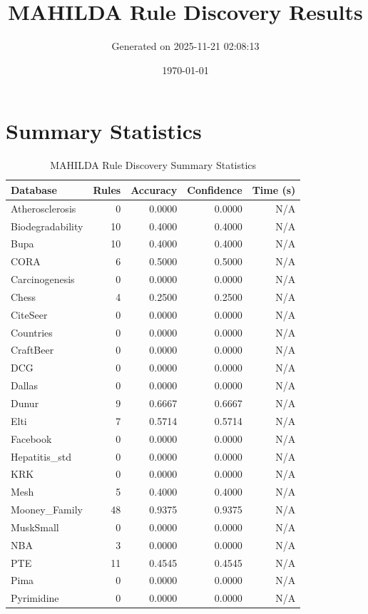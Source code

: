 \documentclass[11pt,a4paper]{article}
\title{MAHILDA Rule Discovery Results}
\author{Generated on 2025-11-21 02:08:13}
\date{\today}
\begin{document}
\maketitle

\section{Summary Statistics}
\begin{table}[h!]
\centering
\caption{MAHILDA Rule Discovery Summary Statistics}
\label{tab:mahilda_summary}
\begin{tabular}{|l|r|r|r|r|}
\hline
\textbf{Database} & \textbf{Rules} & \textbf{Accuracy} & \textbf{Confidence} & \textbf{Time (s)} \\
\hline
Atherosclerosis & 0 & 0.0000 & 0.0000 & N/A \\
Biodegradability & 10 & 0.4000 & 0.4000 & N/A \\
Bupa & 10 & 0.4000 & 0.4000 & N/A \\
CORA & 6 & 0.5000 & 0.5000 & N/A \\
Carcinogenesis & 0 & 0.0000 & 0.0000 & N/A \\
Chess & 4 & 0.2500 & 0.2500 & N/A \\
CiteSeer & 0 & 0.0000 & 0.0000 & N/A \\
Countries & 0 & 0.0000 & 0.0000 & N/A \\
CraftBeer & 0 & 0.0000 & 0.0000 & N/A \\
DCG & 0 & 0.0000 & 0.0000 & N/A \\
Dallas & 0 & 0.0000 & 0.0000 & N/A \\
Dunur & 9 & 0.6667 & 0.6667 & N/A \\
Elti & 7 & 0.5714 & 0.5714 & N/A \\
Facebook & 0 & 0.0000 & 0.0000 & N/A \\
Hepatitis_std & 0 & 0.0000 & 0.0000 & N/A \\
KRK & 0 & 0.0000 & 0.0000 & N/A \\
Mesh & 5 & 0.4000 & 0.4000 & N/A \\
Mooney_Family & 48 & 0.9375 & 0.9375 & N/A \\
MuskSmall & 0 & 0.0000 & 0.0000 & N/A \\
NBA & 3 & 0.0000 & 0.0000 & N/A \\
PTE & 11 & 0.4545 & 0.4545 & N/A \\
Pima & 0 & 0.0000 & 0.0000 & N/A \\
Pyrimidine & 0 & 0.0000 & 0.0000 & N/A \\

\end{tabular}
\end{table}
\end{document}
